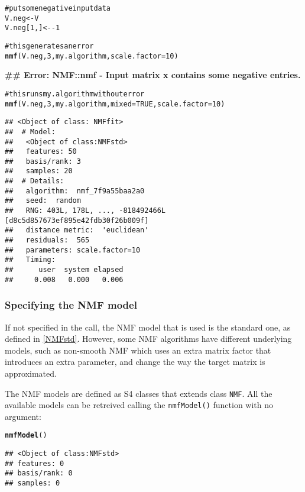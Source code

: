 \documentclass[a4paper]{article}\usepackage{graphicx, color}
\makeatletter
\newcommand{\hlfunctioncall}[1]{\textcolor[rgb]{0.501960784313725,0,0.329411764705882}{\textbf{#1}}}%
\newcommand{\hlcomment}[1]{\textcolor[rgb]{0.180392156862745,0.6,0.341176470588235}{#1}}%
\newenvironment{kframe}{%
 \def\at@end@of@kframe{}%
 \ifinner\ifhmode%
  \def\at@end@of@kframe{\end{minipage}}%
  \begin{minipage}{\columnwidth}%
 \fi\fi%
 \def\FrameCommand##1{\hskip\@totalleftmargin \hskip-\fboxsep
 \colorbox{shadecolor}{##1}\hskip-\fboxsep
     \hskip-\linewidth \hskip-\@totalleftmargin \hskip\columnwidth}%
 \MakeFramed {\advance\hsize-\width
   \@totalleftmargin\z@ \linewidth\hsize
   \@setminipage}}%
 {\par\unskip\endMakeFramed%
 \at@end@of@kframe}
\newenvironment{knitrout}{}{} %
\let\code=\texttt
\renewcommand{\cite}[1]{\parencite{#1}}
\makeatother
\begin{document}
\begin{knitrout}
\color{fgcolor}\begin{kframe}
\begin{alltt}
\hlcomment{# put some negative input data}
V.neg <- V
V.neg[1, ] <- -1

\hlcomment{# this generates an error}
\hlfunctioncall{nmf}(V.neg, 3, my.algorithm, scale.factor = 10)
\end{alltt}


{\ttfamily\noindent\bfseries\textcolor{errorcolor}{\#\# Error: NMF::nmf - Input matrix x contains some negative entries.}}\begin{alltt}

\hlcomment{# this runs my.algorithm without error}
\hlfunctioncall{nmf}(V.neg, 3, my.algorithm, mixed = TRUE, scale.factor = 10)
\end{alltt}
\begin{verbatim}
## <Object of class: NMFfit>
##  # Model:
##   <Object of class:NMFstd>
##   features: 50 
##   basis/rank: 3 
##   samples: 20 
##  # Details:
##   algorithm:  nmf_7f9a55baa2a0 
##   seed:  random 
##   RNG: 403L, 178L, ..., -818492466L [d8c5d857673ef895e42fdb30f26b009f]
##   distance metric:  'euclidean' 
##   residuals:  565 
##   parameters: scale.factor=10 
##   Timing:
##      user  system elapsed 
##     0.008   0.000   0.006
\end{verbatim}
\end{kframe}
\end{knitrout}


\subsubsection{Specifying the NMF model}
If not specified in the call, the NMF model that is used is the standard one, as defined in \cref{NMFstd}. 
However, some NMF algorithms have different underlying models, such as non-smooth NMF \cite{Pascual-Montano2006} which uses an extra matrix factor that introduces an extra parameter, and change the way the target matrix is approximated.

The NMF models are defined as S4 classes that extends class \code{NMF}. All the available models can be retreived calling the \code{nmfModel()} function with no 
argument:

\begin{knitrout}
\color{fgcolor}\begin{kframe}
\begin{alltt}
\hlfunctioncall{nmfModel}()
\end{alltt}
\begin{verbatim}
## <Object of class:NMFstd>
## features: 0 
## basis/rank: 0 
## samples: 0
\end{verbatim}
\end{kframe}
\end{knitrout}
\end{document}
